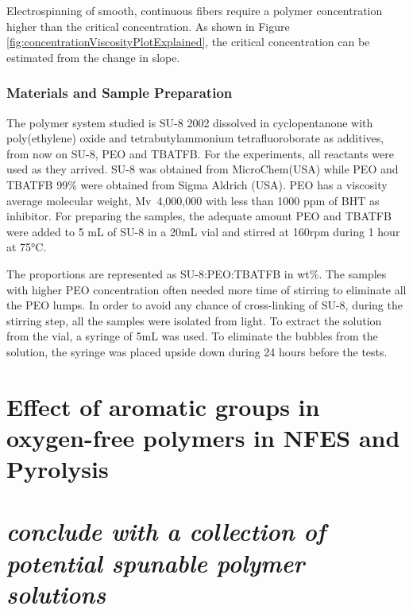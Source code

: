 Electrospinning of smooth, continuous fibers require a polymer concentration higher than the critical concentration. As shown in Figure \ref{fig:concentrationViscosityPlotExplained}, the critical concentration can be estimated from the change in slope. \cite{Burghelea2020, Gupta2005, Han2019} 

\subsubsection{Materials and Sample Preparation}
The polymer system studied is SU-8 2002 dissolved in cyclopentanone with poly(ethylene) oxide and tetrabutylammonium tetrafluoroborate as additives, from now on SU-8, PEO and TBATFB. For the experiments, all reactants were used as they arrived. SU-8 was obtained from MicroChem(USA) while PEO and TBATFB 99\% were obtained from Sigma Aldrich (USA). PEO has a viscosity average molecular weight, Mv~4,000,000 with less than 1000 ppm of BHT as inhibitor. For preparing the samples, the adequate amount PEO and TBATFB were added
to 5 mL of SU-8 in a 20mL vial and stirred at 160rpm during 1 hour at 75°C.

The proportions are represented as SU-8:PEO:TBATFB in wt\%. The samples with higher PEO concentration often needed more time of stirring to eliminate all the PEO lumps. In order to avoid any chance of cross-linking of SU-8, during the stirring step, all the samples were isolated from light. To extract the solution from the vial, a syringe of 5mL was used. To eliminate the bubbles from the solution, the syringe was placed upside down during 24 hours before the tests.


\section{Effect of aromatic groups in oxygen-free polymers in NFES and Pyrolysis}



\section{\emph{conclude with a collection of potential spunable polymer solutions}}
